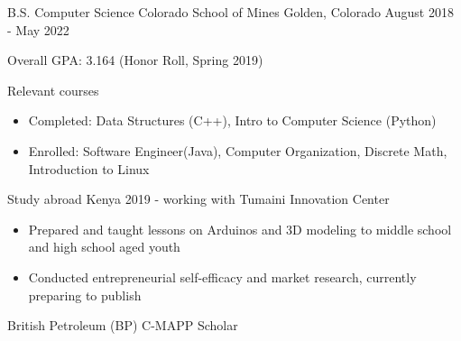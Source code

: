 \vspace{-2.0mm}


\begin{cventries}

  \cventry
    {B.S. Computer Science}
    {Colorado School of Mines} %
    {Golden, Colorado} %
    {August 2018 - May 2022} %
    {
      \begin{cvitems} %
        \item {Overall GPA: 3.164 (Honor Roll, Spring 2019)}
        \item {Relevant courses}
        \begin {itemize}
               \item {Completed: Data Structures (C++), Intro to
    Computer Science (Python)}
        \item {Enrolled: Software Engineer(Java), Computer
    Organization, Discrete Math, Introduction to Linux}
       \end {itemize}
\item {Study abroad Kenya 2019 - working with Tumaini Innovation Center}
  \begin{itemize}
    \item {Prepared and taught lessons on Arduinos and 3D modeling to
    middle school and high school aged youth}
    \item {Conducted entrepreneurial self-efficacy and market research, currently preparing to publish}
\end{itemize}
\item {British Petroleum (BP) C-MAPP Scholar}
      \end{cvitems}
    }



\end{cventries}

